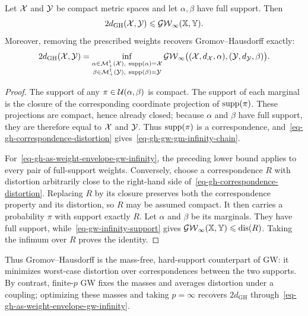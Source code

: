 \begin{prop}\label{prop-gh-gm-gw-infinity}
	Let $\mathcal{X}$ and $\mathcal{Y}$ be compact metric spaces and let $\alpha,\beta$ have full support. Then
	\begin{equation}\label{eq-gh-gw-gm-infinity-chain}
		2d_{\mathrm{GH}}(\mathcal{X},\mathcal{Y})
		\leqslant
		\operatorname{\mathcal{GW}}_\infty(\mathbb{X},\mathbb{Y}).
	\end{equation}
	Moreover, removing the prescribed weights recovers Gromov--Hausdorff exactly:
	\begin{equation}\label{eq-gh-as-weight-envelope-gw-infinity}
		2d_{\mathrm{GH}}(\mathcal{X},\mathcal{Y})
		=
		\inf_{\substack{\alpha\in\mathcal{M}_+^1(\mathcal{X}),\ \operatorname{supp}(\alpha)=\mathcal{X}\\
		                       \beta\in\mathcal{M}_+^1(\mathcal{Y}),\ \operatorname{supp}(\beta)=\mathcal{Y}}}
		\operatorname{\mathcal{GW}}_\infty\bigl((\mathcal{X},d_{\mathcal{X}},\alpha),(\mathcal{Y},d_{\mathcal{Y}},\beta)\bigr).
	\end{equation}
\end{prop}
\begin{proof}
	The support of any $\pi\in\mathcal{U}(\alpha,\beta)$ is compact. The support of each marginal is the closure of the corresponding coordinate projection of $\operatorname{supp}(\pi)$. These projections are compact, hence already closed; because $\alpha$ and $\beta$ have full support, they are therefore equal to $\mathcal{X}$ and $\mathcal{Y}$. Thus $\operatorname{supp}(\pi)$ is a correspondence, and~\eqref{eq-gh-correspondence-distortion} gives~\eqref{eq-gh-gw-gm-infinity-chain}.

	For~\eqref{eq-gh-as-weight-envelope-gw-infinity}, the preceding lower bound applies to every pair of full-support weights. Conversely, choose a correspondence $R$ with distortion arbitrarily close to the right-hand side of~\eqref{eq-gh-correspondence-distortion}. Replacing $R$ by its closure preserves both the correspondence property and its distortion, so $R$ may be assumed compact. It then carries a probability $\pi$ with support exactly $R$. Let $\alpha$ and $\beta$ be its marginals. They have full support, while~\eqref{eq-gw-infinity-support} gives $\operatorname{\mathcal{GW}}_\infty(\mathbb{X},\mathbb{Y})\leqslant\operatorname{dis}(R)$. Taking the infimum over $R$ proves the identity.
\end{proof}

Thus Gromov--Hausdorff is the mass-free, hard-support counterpart of GW: it minimizes worst-case distortion over correspondences between the two supports. By contrast, finite-$p$ GW fixes the masses and averages distortion under a coupling; optimizing these masses and taking $p=\infty$ recovers $2d_{\mathrm{GH}}$ through~\eqref{eq-gh-as-weight-envelope-gw-infinity}.

